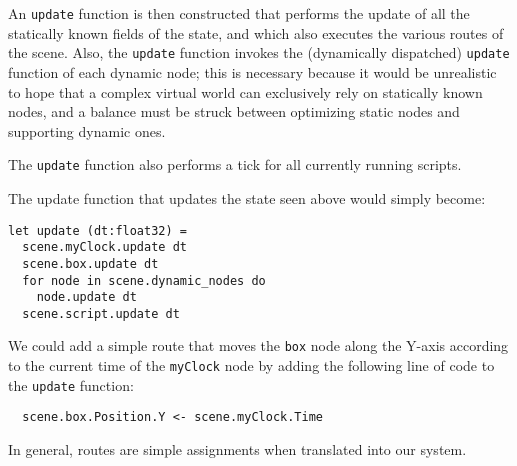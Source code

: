 An \texttt{update} function is then constructed that performs the update of all the statically known fields of the state, and which also executes the various routes of the scene. Also, the \texttt{update} function invokes the (dynamically dispatched) \texttt{update} function of each dynamic node; this is necessary because it would be unrealistic to hope that a complex virtual world can exclusively rely on statically known nodes, and a balance must be struck between optimizing static nodes and supporting dynamic ones.

The \texttt{update} function also performs a tick for all currently running scripts.

The update function that updates the state seen above would simply become:

\begin{lstlisting}
let update (dt:float32) =
  scene.myClock.update dt
  scene.box.update dt
  for node in scene.dynamic_nodes do
    node.update dt
  scene.script.update dt
\end{lstlisting}

We could add a simple route that moves the \texttt{box} node along the Y-axis according to the current time of the \texttt{myClock} node by adding the following line of code to the \texttt{update} function:

\begin{lstlisting}
  scene.box.Position.Y <- scene.myClock.Time
\end{lstlisting}

In general, routes are simple assignments when translated into our system.